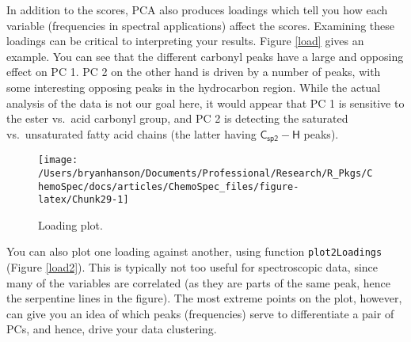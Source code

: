 \documentclass[letter,10pt,twocolumn,twoside,printwatermark=false]{pinp}
\begin{document}
In addition to the scores, PCA also produces loadings which tell you how
each variable (frequencies in spectral applications) affect the scores.
Examining these loadings can be critical to interpreting your results.
Figure \ref{load} gives an example. You can see that the different
carbonyl peaks have a large and opposing effect on PC 1. PC 2 on the
other hand is driven by a number of peaks, with some interesting
opposing peaks in the hydrocarbon region. While the actual analysis of
the data is not our goal here, it would appear that PC 1 is sensitive to
the ester vs.~acid carbonyl group, and PC 2 is detecting the saturated
vs.~unsaturated fatty acid chains (the latter having
\(\mathsf{C_{sp2}-H}\) peaks).

\begin{Shaded}
\begin{Highlighting}[]
   \NormalTok{(}\NormalTok{, }\NormalTok{),}
   \NormalTok{)}
\end{Highlighting}
\end{Shaded}

\begin{figure}

{\centering \texttt{[image: /Users/bryanhanson/Documents/Professional/Research/R\_Pkgs/ChemoSpec/docs/articles/ChemoSpec\_files/figure-latex/Chunk29-1]} 

}

\caption{\label{load}Loading plot.}\label{fig:Chunk29}
\end{figure}

You can also plot one loading against another, using function
\texttt{plot2Loadings} (Figure \ref{load2}). This is typically not too
useful for spectroscopic data, since many of the variables are
correlated (as they are parts of the same peak, hence the serpentine
lines in the figure). The most extreme points on the plot, however, can
give you an idea of which peaks (frequencies) serve to differentiate a
pair of PCs, and hence, drive your data clustering.

\begin{Shaded}
\begin{Highlighting}[]
\StringTok{ }
   \NormalTok{(}\NormalTok{, }\NormalTok{),}
   \NormalTok{)}
\end{Highlighting}
\end{Shaded}
\end{document}

